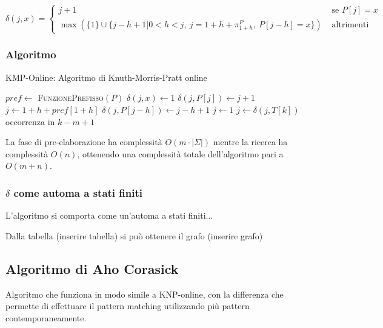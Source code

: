 $$
\delta(j,x) = \begin{cases}
j+1 & \text{ se } P[j] = x \\
\max(\{1\} \cup \{ j - h + 1 | 0 < h < j, \: j = 1 + h + \pi_{1+h}^P, \: P[j-h] = x\}) & \text{ altrimenti}
\end{cases}
$$

\subsubsection{Algoritmo}

\begin{breakablealgorithm}
	\caption{KMP-Online: Algoritmo di Knuth-Morris-Pratt online}
	\begin{algorithmic}[1]
			\State $ pref \gets $ \textsc{FunzionePrefisso}$ (P) $
					\State $ \delta(j,x) \gets 1 $
				\EndFor
			\EndFor
				\State $ \delta(j, P[j]) \gets j+1 $ 
			\EndFor
			 
				\State $ j \gets 1 + h + pref[1 + h] $
				\State $ \delta(j, P[j-h]) \gets j -h +1  $
			\EndFor
			\State $ j \gets 1 $
				\State $ j \gets \delta(j, T[k]) $
					\State occorrenza in $ k-m+1 $
				\EndIf
			\EndFor
		\EndFunction
	\end{algorithmic}
\end{breakablealgorithm}


La fase di pre-elaborazione ha complessità $ O(m \cdot | \Sigma|) $ mentre la ricerca ha complessità $ O(n) $, ottenendo una complessità totale dell'algoritmo pari a $ O(m + n) $.

\subsubsection{$ \delta $ come automa a stati finiti}


L'algoritmo si comporta come un'automa a stati finiti...

Dalla tabella (inserire tabella) si può ottenere il grafo (inserire grafo)

\subsection{Algoritmo di Aho Corasick}\label{algoritmo-di-aho-corasick}

Algoritmo che funziona in modo simile a KNP-online, con la differenza
che permette di effettuare il pattern matching utilizzando più pattern
contemporaneamente.
